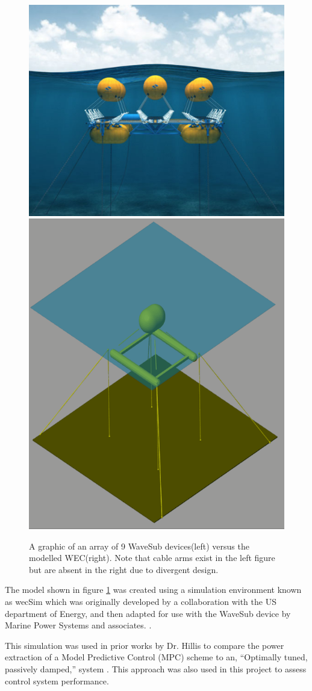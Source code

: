 \documentclass{report}
\begin{document}
\begin{figure}
\centering
\includegraphics[height=0.4\textwidth]{graphics/waveSub}
\includegraphics[height=0.4\textwidth]{graphics/wecSimFloat}
\caption{A graphic of an array of 9 WaveSub devices(left)\cite{waveSub} versus the modelled WEC(right). Note that cable arms exist in the left figure but are absent in the right due to divergent design.}
\label{fig:waveSub}
\end{figure}
\FloatBarrier

The model shown in figure \ref{fig:waveSub}  was created using a simulation environment known as wecSim\cite{wecSim} which was originally developed by a collaboration with the US department of Energy, and then adapted for use with the WaveSub device by Marine Power Systems and associates. \cite{waveSub}.

This simulation was used in prior works by Dr. Hillis to compare the power extraction of a Model Predictive Control (MPC) scheme to an, ``Optimally tuned, passively damped,'' system \cite{andyMPC}. This approach was also used in this project to assess control system performance. 
\end{document}
